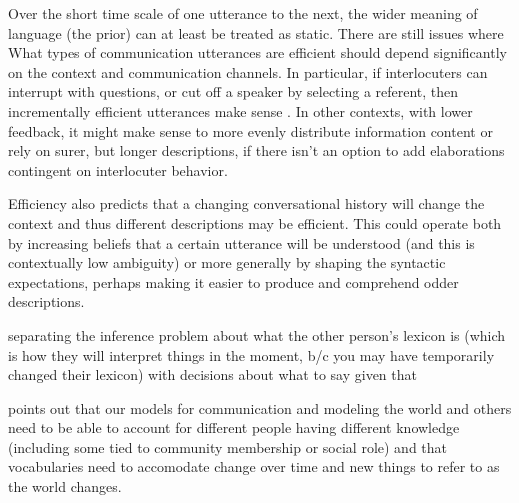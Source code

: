 \documentclass[]{article}
\begin{document}
Over the short time scale of one utterance to the next, the wider meaning of language (the prior) can at least be treated as static. There are still issues where What types of communication utterances are efficient should depend significantly on the context and communication channels. In particular, if interlocuters can interrupt with questions, or cut off a speaker by selecting a referent, then incrementally efficient utterances make sense \cite{gibson2019}. In other contexts, with lower feedback, it might make sense to more evenly distribute information content or rely on surer, but longer descriptions, if there isn't an option to add elaborations contingent on interlocuter behavior.

Efficiency also predicts that a changing conversational history will change the context and thus different descriptions may be efficient. This could operate both by increasing beliefs that a certain utterance will be understood (and this is contextually low ambiguity) or more generally by shaping the syntactic expectations, perhaps making it easier to produce and comprehend odder descriptions. 

\cite{hawkins2021} separating the inference problem about what the other person's lexicon is (which is how they will interpret things in the moment, b/c you may have temporarily changed their lexicon) with decisions about what to say given that 

\cite{hawkins2021} points out that our models for communication and modeling the world and others need to be able to account for different people having different knowledge (including some tied to community membership or social role) and that vocabularies need to accomodate change over time and new things to refer to as the world changes. 
\end{document}
